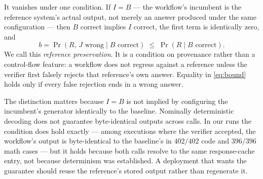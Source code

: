 \documentclass{article}
\newcommand{\brate}{b}
\begin{document}
It vanishes under one condition. If $I = B$ --- the workflow's incumbent is the
reference system's actual output, not merely an answer produced under the same
configuration --- then $B$ correct implies $I$ correct, the first term is
identically zero, and
\begin{equation}
\brate = \Pr(R,\, J\text{ wrong} \mid B\text{ correct})
       \;\le\; \Pr(R \mid B\text{ correct}).
\label{eq:bound}
\end{equation}
We call this \emph{reference preservation}. It is a condition on provenance
rather than a control-flow feature: a workflow does not regress against a
reference unless the verifier first falsely rejects that reference's own
answer. Equality in \eqref{eq:bound} holds only if every false rejection ends
in a wrong answer.

The distinction matters because $I=B$ is not implied by configuring the
incumbent's generator identically to the baseline. Nominally deterministic
decoding does not guarantee byte-identical outputs across calls. In our runs
the condition does hold exactly --- among executions where the verifier
accepted, the workflow's output is byte-identical to the baseline's in
$402/402$ code and $396/396$ math cases --- but it holds because both calls
resolve to the same response-cache entry, not because determinism was
established. A deployment that wants the guarantee should reuse the reference's
stored output rather than regenerate it.
\end{document}
